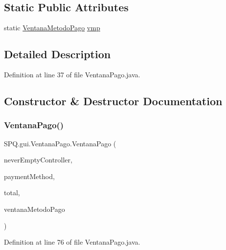 \subsection*{Static Public Attributes}
\begin{DoxyCompactItemize}
\item 
static \mbox{\hyperlink{class_s_p_q_1_1gui_1_1_ventana_metodo_pago}{Ventana\+Metodo\+Pago}} \mbox{\hyperlink{class_s_p_q_1_1gui_1_1_ventana_pago_a892d5d5fa9310e73e222681af8d5a53f}{vmp}}
\end{DoxyCompactItemize}


\subsection{Detailed Description}


Definition at line 37 of file Ventana\+Pago.\+java.



\subsection{Constructor \& Destructor Documentation}
\mbox{\label{class_s_p_q_1_1gui_1_1_ventana_pago_ac192c8e330c672202608380ffaabd275}} 
\subsubsection{\texorpdfstring{Ventana\+Pago()}{VentanaPago()}}
{\footnotesize\ttfamily S\+P\+Q.\+gui.\+Ventana\+Pago.\+Ventana\+Pago (\begin{DoxyParamCaption}\item[{\mbox{\hyperlink{class_s_p_q_1_1controller_1_1_never_empty_controller}{Never\+Empty\+Controller}}}]{never\+Empty\+Controller,  }\item[{String}]{payment\+Method,  }\item[{double}]{total,  }\item[{\mbox{\hyperlink{class_s_p_q_1_1gui_1_1_ventana_metodo_pago}{Ventana\+Metodo\+Pago}}}]{ventana\+Metodo\+Pago }\end{DoxyParamCaption})}



Definition at line 76 of file Ventana\+Pago.\+java.

